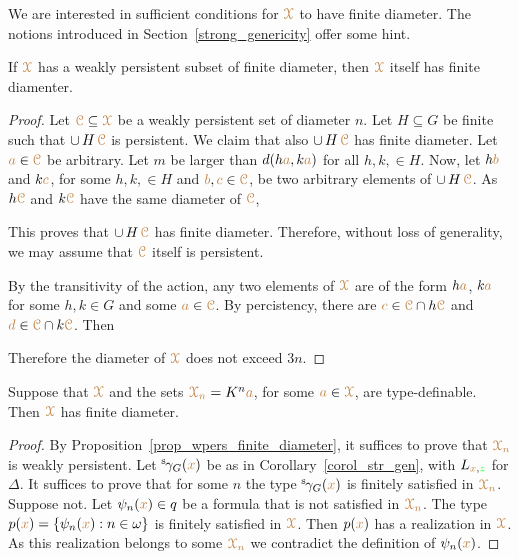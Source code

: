 We are interested in sufficient conditions for ${\color{brown}\EuScript X}$ to have finite diameter.
The notions introduced in Section~\ref{strong_genericity} offer some hint.

\begin{proposition}\label{prop_wpers_finite_diameter}
  If ${\color{brown}\EuScript X}$ has a weakly persistent subset of finite diameter, then ${\color{brown}\EuScript X}$ itself has finite diamenter.
\end{proposition}

\begin{proof}
  Let ${\color{brown}\EuScript C}\subseteq{\color{brown}\EuScript X}$ be a weakly persistent set of diameter $n$.
  Let $H\subseteq G$ be finite such that $\cup\,H\,{\color{brown}\EuScript C}$ is persistent.
  We claim that also $\cup\,H\,{\color{brown}\EuScript C}$ has finite diameter.
  Let ${\color{brown} a}\in{\color{brown}\EuScript C}$ be arbitrary.
  Let $m$ be larger than $d(h{\color{brown} a}, k{\color{brown} a})$ for all $h,k,\in H$.
  Now, let $h{\color{brown} b}$ and $k{\color{brown} c}$, for some $h,k,\in H$ and ${\color{brown} b},{\color{brown} c}\in{\color{brown}\EuScript C}$, be two arbitrary elements of $\cup\,H\,{\color{brown}\EuScript C}$.
  As $h{\color{brown}\EuScript C}$ and $k{\color{brown}\EuScript C}$ have the same diameter of ${\color{brown}\EuScript C}$, 



  This proves that $\cup\,H\,{\color{brown}\EuScript C}$ has finite diameter.
  Therefore, without loss of generality, we may assume that ${\color{brown}\EuScript C}$ itself is persistent.
  
  By the transitivity of the action, any two elements of ${\color{brown}\EuScript X}$ are of the form $h{\color{brown} a}$, $k{\color{brown} a}$ for some $h,k\in G$ and some ${\color{brown} a}\in{\color{brown}\EuScript C}$.
  By percistency, there are ${\color{brown} c}\in{\color{brown}\EuScript C}\cap h{\color{brown}\EuScript C}$ and ${\color{brown} d}\in{\color{brown}\EuScript C}\cap k{\color{brown}\EuScript C}$.
  Then 



  Therefore the diameter of ${\color{brown}\EuScript X}$ does not exceed $3n$.
\end{proof}

\begin{theorem}\label{thm_newelski}
  Suppose that ${\color{brown}\EuScript X}$ and the sets ${\color{brown}\EuScript X_n}=K^n{\color{brown} a}$, for some ${\color{brown} a}\in{\color{brown}\EuScript X}$, are type-definable.
  Then ${\color{brown}\EuScript X}$ has finite diameter.
\end{theorem}

\begin{proof}
  By Proposition~\ref{prop_wpers_finite_diameter}, it suffices to prove that ${\color{brown}\EuScript X_n}$ is weakly persistent.
  Let ${}^{\rm s}\kern-.2ex\gamma_G({\color{brown} x})$ be as in Corollary~\ref{corol_str_gen}, with $L_{{\color{brown} x},{\color{green} z}}$ for $\Delta$.
  It suffices to prove that for some $n$ the type ${}^{\rm s}\kern-.2ex\gamma_G({\color{brown} x})$ is finitely satisfied in $\color{brown}\EuScript X_n$.
  Suppose not.
  Let $\psi_n({\color{brown} x})\in q$ be a formula that is not satisfied in $\color{brown}\EuScript X_n$.
  The type $p({\color{brown} x})=\{\psi_n({\color{brown} x}):n\in\omega\}$ is finitely satisfied in ${\color{brown}\EuScript X}$.
  Then $p({\color{brown} x})$ has a realization in ${\color{brown}\EuScript X}$. 
  As this realization belongs to some ${\color{brown}\EuScript X_n}$ we contradict the definition of $\psi_n({\color{brown} x})$. 
\end{proof}

